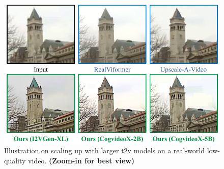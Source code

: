 

\begin{figure}
    \centering
    \includegraphics[width=1\linewidth]{figure/t2v_ablation.pdf}
    \caption{Illustration on scaling up with larger t2v models on a real-world low-quality video. \textbf{(Zoom-in for best view)}}
    \label{fig:ablation3}
\end{figure}

